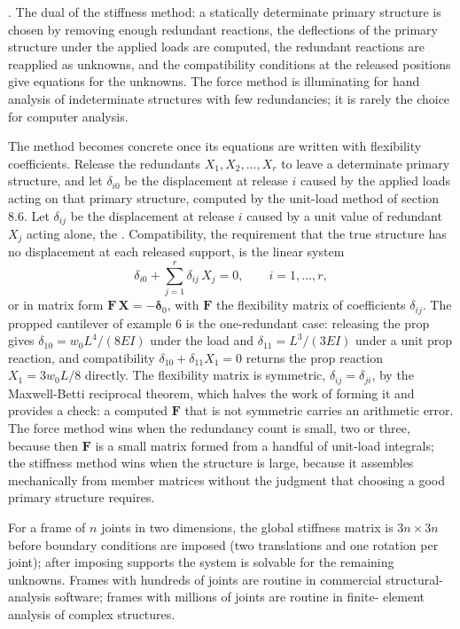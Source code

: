 . The dual of the
stiffness method: a statically determinate primary structure is
chosen by removing enough redundant reactions, the deflections of the
primary structure under the applied loads are computed, the
redundant reactions are reapplied as unknowns, and the compatibility
conditions at the released positions give equations for the unknowns.
The force method is illuminating for hand analysis of indeterminate
structures with few redundancies; it is rarely the choice for
computer analysis.

The method becomes concrete once its equations are written with
flexibility coefficients. Release the redundants $X_1, X_2, \dots, X_r$
to leave a determinate primary structure, and let $\delta_{i0}$ be the
displacement at release $i$ caused by the applied loads acting on that
primary structure, computed by the unit-load method of section 8.6. Let
$\delta_{ij}$ be the displacement at release $i$ caused by a unit value
of redundant $X_j$ acting alone, the .
Compatibility, the requirement that the true structure has no
displacement at each released support, is the linear system
\[
\delta_{i0} + \sum_{j=1}^{r} \delta_{ij}\,X_j = 0, \qquad i = 1,\dots,r,
\]
or in matrix form $\mathbf{F}\,\mathbf{X} = -\boldsymbol{\delta}_0$, with
$\mathbf{F}$ the flexibility matrix of coefficients $\delta_{ij}$. The
propped cantilever of example 6 is the one-redundant case: releasing the
prop gives $\delta_{10} = w_0 L^4/(8EI)$ under the load and $\delta_{11}
= L^3/(3EI)$ under a unit prop reaction, and compatibility $\delta_{10} +
\delta_{11} X_1 = 0$ returns the prop reaction $X_1 = 3 w_0 L/8$ directly.
The flexibility matrix is symmetric, $\delta_{ij} = \delta_{ji}$, by the
Maxwell-Betti reciprocal theorem, which halves the work of forming it and
provides a check: a computed $\mathbf{F}$ that is not symmetric carries an
arithmetic error. The force method wins when the redundancy count is
small, two or three, because then $\mathbf{F}$ is a small matrix formed
from a handful of unit-load integrals; the stiffness method wins when the
structure is large, because it assembles mechanically from member
matrices without the judgment that choosing a good primary structure
requires.

For a frame of $n$ joints in two dimensions, the global stiffness
matrix is $3n \times 3n$ before boundary conditions are imposed (two
translations and one rotation per joint); after imposing supports
the system is solvable for the remaining unknowns. Frames with
hundreds of joints are routine in commercial structural-analysis
software; frames with millions of joints are routine in finite-
element analysis of complex structures.

